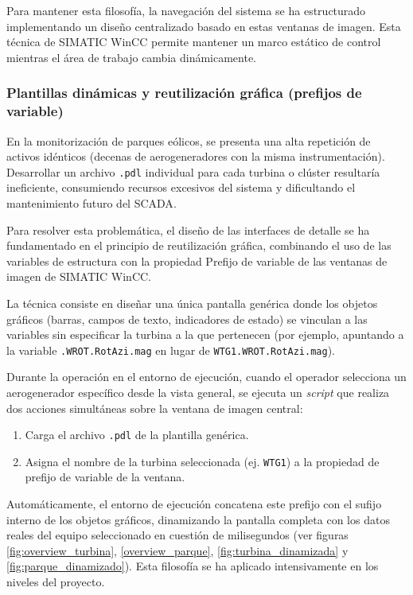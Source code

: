 Para mantener esta filosofía, la navegación del sistema se ha estructurado implementando un diseño centralizado basado en estas ventanas de imagen. Esta técnica de SIMATIC WinCC permite mantener un marco estático de control mientras el área de trabajo cambia dinámicamente. 

\subsubsection{Plantillas dinámicas y reutilización gráfica (prefijos de variable)}
\label{sec:tag_prefix}

En la monitorización de parques eólicos, se presenta una alta repetición de activos idénticos (decenas de aerogeneradores con la misma instrumentación). Desarrollar un archivo \texttt{.pdl} individual para cada turbina o clúster resultaría ineficiente, consumiendo recursos excesivos del sistema y dificultando el mantenimiento futuro del \ac{SCADA}. 

Para resolver esta problemática, el diseño de las interfaces de detalle se ha fundamentado en el principio de reutilización gráfica, combinando el uso de las variables de estructura con la propiedad Prefijo de variable de las ventanas de imagen de SIMATIC WinCC.

La técnica consiste en diseñar una única pantalla genérica  donde los objetos gráficos (barras, campos de texto, indicadores de estado) se vinculan a las variables sin especificar la turbina a la que pertenecen (por ejemplo, apuntando a la variable \texttt{.WROT.RotAzi.mag} en lugar de \texttt{WTG1.WROT.RotAzi.mag}).

Durante la operación en el entorno de ejecución, cuando el operador selecciona un aerogenerador específico desde la vista general, se ejecuta un \textit{script} que realiza dos acciones simultáneas sobre la ventana de imagen central:
\begin{enumerate}
    \item Carga el archivo \texttt{.pdl} de la plantilla genérica.
    \item Asigna el nombre de la turbina seleccionada (ej. \texttt{WTG1}) a la propiedad de prefijo de variable de la ventana.
\end{enumerate}

Automáticamente, el entorno de ejecución concatena este prefijo con el sufijo interno de los objetos gráficos, dinamizando la pantalla completa con los datos reales del equipo seleccionado en cuestión de milisegundos (ver figuras \ref{fig:overview_turbina}, \ref{overview_parque}, \ref{fig:turbina_dinamizada} y \ref{fig:parque_dinamizado}). Esta filosofía se ha aplicado intensivamente en los niveles del proyecto.



